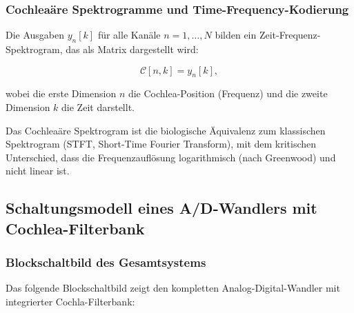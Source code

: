 ﻿\documentclass[12pt, a4paper]{article}
\theoremstyle{definition}
\theoremstyle{remark}
\begin{document}
\subsubsection{Cochleaäre Spektrogramme und Time-Frequency-Kodierung}

Die Ausgaben $y_n[k]$ für alle Kanäle $n = 1, \ldots, N$ bilden ein 
Zeit-Frequenz-Spektrogram, das als Matrix dargestellt wird:

\begin{equation}
\label{eq:cochleagram_matrix}
\mathcal{C}[n, k] = y_n[k],
\end{equation}

wobei die erste Dimension $n$ die Cochlea-Position (Frequenz) und die zweite 
Dimension $k$ die Zeit darstellt.

Das Cochleaäre Spektrogram ist die biologische Äquivalenz zum klassischen 
Spektrogram (STFT, Short-Time Fourier Transform), mit dem kritischen Unterschied, 
dass die Frequenzauflösung logarithmisch (nach Greenwood) und nicht linear ist.

\subsection{Schaltungsmodell eines A/D-Wandlers mit Cochlea-Filterbank}

\subsubsection{Blockschaltbild des Gesamtsystems}

Das folgende Blockschaltbild zeigt den kompletten Analog-Digital-Wandler mit 
integrierter Cochla-Filterbank:
\end{document}
